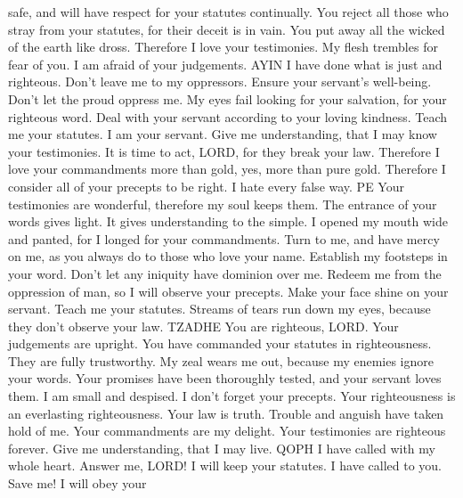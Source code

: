 safe, and will have respect for your statutes continually.
 You reject all those who stray from your statutes, for
their deceit is in vain.  You put away all the wicked of
the earth like dross. Therefore I love your testimonies.
 My flesh trembles for fear of you. I am afraid of your
judgements. AYIN  I have done what is just and
righteous. Don't leave me to my oppressors.  Ensure your
servant's well-being. Don't let the proud oppress me. 
My eyes fail looking for your salvation, for your righteous word.
 Deal with your servant according to your loving
kindness. Teach me your statutes.  I am your servant.
Give me understanding, that I may know your testimonies.
 It is time to act, LORD, for they break your law.
 Therefore I love your commandments more than gold, yes,
more than pure gold.  Therefore I consider all of your
precepts to be right. I hate every false way. PE  Your
testimonies are wonderful, therefore my soul keeps them.
 The entrance of your words gives light. It gives
understanding to the simple.  I opened my mouth wide and
panted, for I longed for your commandments.  Turn to me,
and have mercy on me, as you always do to those who love your name.
 Establish my footsteps in your word. Don't let any
iniquity have dominion over me.  Redeem me from the
oppression of man, so I will observe your precepts. 
Make your face shine on your servant. Teach me your statutes.
 Streams of tears run down my eyes, because they don't
observe your law. TZADHE  You are righteous, LORD. Your
judgements are upright.  You have commanded your
statutes in righteousness. They are fully trustworthy. 
My zeal wears me out, because my enemies ignore your words.
 Your promises have been thoroughly tested, and your
servant loves them.  I am small and despised. I don't
forget your precepts.  Your righteousness is an
everlasting righteousness. Your law is truth.  Trouble
and anguish have taken hold of me. Your commandments are my delight.
 Your testimonies are righteous forever. Give me
understanding, that I may live. QOPH  I have called with
my whole heart. Answer me, LORD! I will keep your statutes.
 I have called to you. Save me! I will obey your
